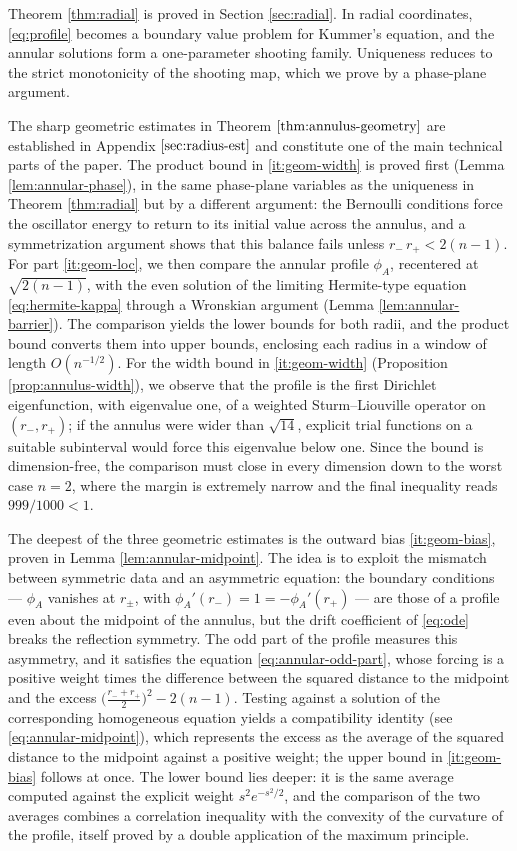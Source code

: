\documentclass[11pt]{article}
\numberwithin{equation}{section}
\theoremstyle{definition}
\begin{document}
Theorem \ref{thm:radial} is proved in Section \ref{sec:radial}. In radial coordinates, \eqref{eq:profile} becomes a boundary value problem for Kummer's equation, and the annular solutions form a one-parameter shooting family. Uniqueness reduces to the strict monotonicity of the shooting map, which we prove by a phase-plane argument.

The sharp geometric estimates in Theorem \(\ref{thm:annulus-geometry}\) are established in Appendix \(\ref{sec:radius-est}\) and constitute one of the main technical parts of the paper. The product bound in \ref{it:geom-width} is proved first (Lemma \ref{lem:annular-phase}), in the same phase-plane variables as the uniqueness in Theorem \ref{thm:radial} but by a different argument: the Bernoulli conditions force the oscillator energy to return to its initial value across the annulus, and a symmetrization argument shows that this balance fails unless $r_-\,r_+<2(n-1)$. For part \ref{it:geom-loc}, we then compare the annular profile $\phi_A$, recentered at $\sqrt{2(n-1)}$, with the even solution of the limiting Hermite-type equation \eqref{eq:hermite-kappa} through a Wronskian argument (Lemma \ref{lem:annular-barrier}). The comparison yields the lower bounds for both radii, and the product bound converts them into upper bounds, enclosing each radius in a window of length $O(n^{-1/2})$. For the width bound in \ref{it:geom-width} (Proposition \ref{prop:annulus-width}), we observe that the profile is the first Dirichlet eigenfunction, with eigenvalue one, of a weighted Sturm--Liouville operator on $(r_-,r_+)$; if the annulus were wider than $\sqrt{14}$, explicit trial functions on a suitable subinterval would force this eigenvalue below one. Since the bound is dimension-free, the comparison must close in every dimension down to the worst case $n=2$, where the margin is extremely narrow and the final inequality reads $999/1000<1$.

The deepest of the three geometric estimates is the outward bias \ref{it:geom-bias}, proven in Lemma \ref{lem:annular-midpoint}. The idea is to exploit the mismatch between symmetric data and an asymmetric equation: the boundary conditions --- $\phi_A$ vanishes at $r_\pm$, with $\phi_A'(r_-)=1=-\phi_A'(r_+)$ --- are those of a profile even about the midpoint of the annulus, but the drift coefficient of \eqref{eq:ode} breaks the reflection symmetry. The odd part of the profile measures this asymmetry, and it satisfies the equation \eqref{eq:annular-odd-part}, whose forcing is a positive weight times the difference between the squared distance to the midpoint and the excess $\bigl(\tfrac{r_-+r_+}{2}\bigr)^2-2(n-1)$. Testing against a solution of the corresponding homogeneous equation yields a compatibility identity (see \eqref{eq:annular-midpoint}), which represents the excess as the average of the squared distance to the midpoint against a positive weight; the upper bound in \ref{it:geom-bias} follows at once. The lower bound lies deeper: it is the same average computed against the explicit weight $s^2e^{-s^2/2}$, and the comparison of the two averages combines a correlation inequality with the convexity of the curvature of the profile, itself proved by a double application of the maximum principle.
\end{document}
